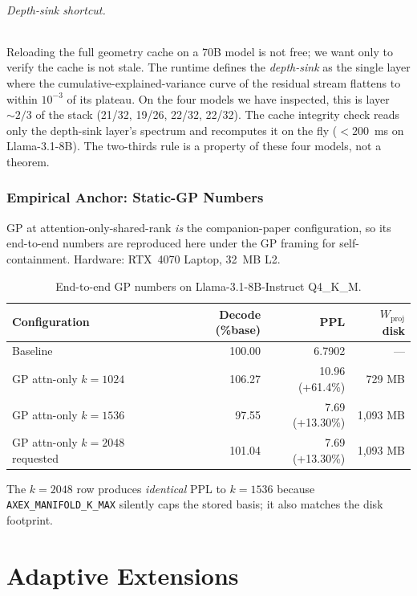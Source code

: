 \documentclass[11pt]{article}
\begin{document}
\paragraph{Depth-sink shortcut.}  Reloading the full geometry cache on a
70B model is not free; we want only to verify the cache is not stale.
The runtime defines the \emph{depth-sink} as the single layer where the
cumulative-explained-variance curve of the residual stream flattens to
within $10^{-3}$ of its plateau.  On the four models we have inspected,
this is layer $\sim 2/3$ of the stack (21/32, 19/26, 22/32, 22/32).  The
cache integrity check reads only the depth-sink layer's spectrum and
recomputes it on the fly ($<200$~ms on Llama-3.1-8B).  The two-thirds rule
is a property of these four models, not a theorem.

\section{Empirical Anchor: Static-GP Numbers}
\label{sec:anchor}
GP at attention-only-shared-rank \emph{is} the companion-paper configuration,
so its end-to-end numbers are reproduced here under the GP framing for
self-containment.  Hardware: RTX~4070 Laptop, 32~MB L2.

\begin{table}[h]\centering\small
\caption{End-to-end GP numbers on Llama-3.1-8B-Instruct Q4\_K\_M.}
\begin{tabular}{@{}lrrr@{}}
\toprule
Configuration & Decode (\%base) & PPL & $W_\text{proj}$ disk \\
\midrule
Baseline & 100.00 & 6.7902 & --- \\
GP attn-only $k{=}1024$ & 106.27 & 10.96 (+61.4\%) & 729 MB \\
GP attn-only $k{=}1536$ & 97.55  & 7.69 (+13.30\%) & 1{,}093 MB \\
GP attn-only $k{=}2048$ requested & 101.04 & 7.69 (+13.30\%) & 1{,}093 MB \\
\bottomrule
\end{tabular}
\end{table}

The $k{=}2048$ row produces \emph{identical} PPL to $k{=}1536$ because
\texttt{AXEX\_MANIFOLD\_K\_MAX} silently caps the stored basis; it
also matches the disk footprint.

\part{Adaptive Extensions}
\end{document}
